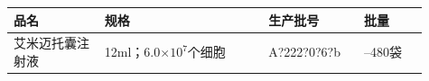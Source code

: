 \documentclass[UTF8,10pt,a4paper,fontset=fandol]{ctexart}
\newcommand{\fieldvalue}[1]{#1}
\newcommand{\handwritten}[1]{#1}
\begin{document}
\vspace{2pt}

\noindent
\begin{tabular}{|p{0.20\linewidth}|p{0.36\linewidth}|p{0.21\linewidth}|p{0.14\linewidth}|}
\hline
\centering 品名 & \centering 规格 & \centering 生产批号 & \centering 批量\\
\hline
\centering 艾米迈托囊注射液 &
\centering 12ml；6.0$\times 10^{7}$个细胞 &
\centering
\fieldvalue{\handwritten{A?222?0?6?b}} &
\centering 200--480袋\\
\hline
\end{tabular}

\vspace{2pt}

\noindent
\end{document}
